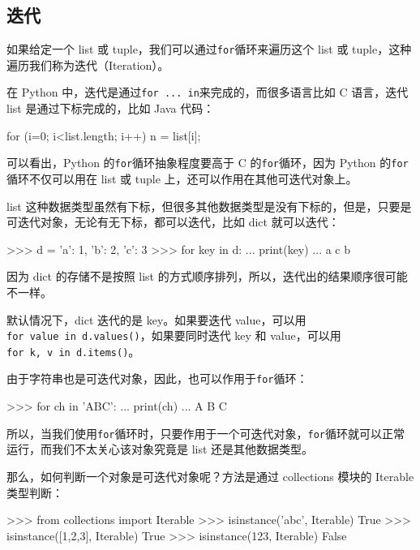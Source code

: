 \hypertarget{ux8fedux4ee3}{%
\subsection{迭代}\label{ux8fedux4ee3}}

如果给定一个 list 或 tuple，我们可以通过\texttt{for}循环来遍历这个 list
或 tuple，这种遍历我们称为迭代（Iteration）。

在 Python 中，迭代是通过\texttt{for\ ...\ in}来完成的，而很多语言比如 C
语言，迭代 list 是通过下标完成的，比如 Java 代码：

\begin{pythoncode}
for (i=0; i<list.length; i++) {
    n = list[i];
}
\end{pythoncode}

可以看出，Python 的\texttt{for}循环抽象程度要高于 C
的\texttt{for}循环，因为 Python 的\texttt{for}循环不仅可以用在 list 或
tuple 上，还可以作用在其他可迭代对象上。

list
这种数据类型虽然有下标，但很多其他数据类型是没有下标的，但是，只要是可迭代对象，无论有无下标，都可以迭代，比如
dict 就可以迭代：

\begin{pythoncode}
>>> d = {'a': 1, 'b': 2, 'c': 3}
>>> for key in d:
...     print(key)
...
a
c
b
\end{pythoncode}

因为 dict 的存储不是按照 list
的方式顺序排列，所以，迭代出的结果顺序很可能不一样。

默认情况下，dict 迭代的是 key。如果要迭代
value，可以用\texttt{for\ value\ in\ d.values()}，如果要同时迭代 key 和
value，可以用\texttt{for\ k,\ v\ in\ d.items()}。

由于字符串也是可迭代对象，因此，也可以作用于\texttt{for}循环：

\begin{pythoncode}
>>> for ch in 'ABC':
...     print(ch)
...
A
B
C
\end{pythoncode}

所以，当我们使用\texttt{for}循环时，只要作用于一个可迭代对象，\texttt{for}循环就可以正常运行，而我们不太关心该对象究竟是
list 还是其他数据类型。

那么，如何判断一个对象是可迭代对象呢？方法是通过 collections 模块的
Iterable 类型判断：

\begin{pythoncode}
>>> from collections import Iterable
>>> isinstance('abc', Iterable) 
True
>>> isinstance([1,2,3], Iterable) 
True
>>> isinstance(123, Iterable) 
False
\end{pythoncode}


